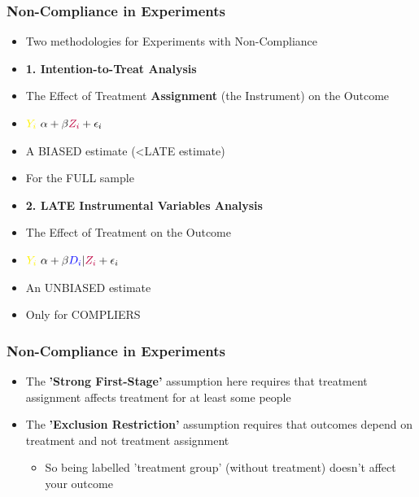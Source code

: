 \documentclass[xcolor=x11names,compress]{beamer}\usepackage[]{graphicx}\usepackage[]{color}
\renewcommand{\(}{\begin{columns}}
\renewcommand{\)}{\end{columns}}
\newcommand{\<}[1]{\begin{column}{#1}}
\renewcommand{\>}{\end{column}}
\begin{document}
\begin{frame}
\frametitle{Non-Compliance in Experiments}
\begin{itemize}
\item Two methodologies for Experiments with Non-Compliance
\end{itemize}
\begin{multicols}{2}
\begin{itemize}
\item \textbf{1. Intention-to-Treat Analysis}
\pause
\item The Effect of Treatment \textbf{Assignment} (the Instrument) on the Outcome
\pause
\item $\textcolor{yellow}{Y_i} ~ \alpha + \beta \textcolor{purple}{Z_i} + \epsilon_i$
\pause
\item A BIASED estimate (<LATE estimate)
\pause
\item For the FULL sample
\end{itemize}
\columnbreak
\begin{itemize}
\item \textbf{2. LATE Instrumental Variables Analysis}
\pause
\item The Effect of Treatment on the Outcome
\pause
\item $\textcolor{yellow}{Y_i} ~ \alpha + \beta \textcolor{blue}{D_i}|\textcolor{purple}{Z_i} + \epsilon_i$
\pause
\item An UNBIASED estimate
\pause
\item Only for COMPLIERS
\end{itemize}
\end{multicols}
\end{frame}

\begin{frame}
\frametitle{Non-Compliance in Experiments}
\begin{itemize}
\item The \textbf{'Strong First-Stage'} assumption here requires that treatment assignment affects treatment for at least some people
\pause
\item The \textbf{'Exclusion Restriction'} assumption requires that outcomes depend on treatment and not treatment assignment
\begin{itemize}
\item So being labelled 'treatment group' (without treatment) doesn't affect your outcome
\end{itemize}
\end{itemize}
\end{frame}
\end{document}
